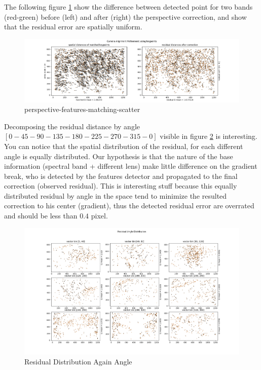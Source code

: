 \documentclass[]{elsarticle}
\begin{document}
	The following figure \ref{fig:perspective-features-matching-scatter} show the difference between detected point for two bands (red-green)
	before (left) and after (right) the perspective correction, and show that the residual error are spatially uniform.
	
	\begin{figure}[!htb]
		\centering
		\includegraphics[width=\linewidth]{../figures/perspective-features-matching-scatter.png}
		\caption{perspective-features-matching-scatter}
		\label{fig:perspective-features-matching-scatter}
	\end{figure}
	
	Decomposing the residual distance by angle $[0-45-90-135-180-225-270-315-0]$ visible in figure \ref{fig:residual-angle} is interesting.
	You can notice that the spatial distribution of the residual, for each different angle is equally distributed.
	Our hypothesis is that the nature of the base information (spectral band + different lens) make little difference on the gradient break,
	who is detected by the features detector and propagated to the final correction (observed residual).
	This is interesting stuff because this equally distributed residual by angle in the space tend to minimize the resulted correction to his center (gradient),
	thus the detected residual error are overrated and should be less than $0.4$ pixel.
	
	\begin{figure}[!htb]
		\centering
		\includegraphics[width=\linewidth]{../figures/perspective-features-residual.png}
		\caption{Residual Distribution Again Angle}
		\label{fig:residual-angle}
	\end{figure}
	
\end{document}
